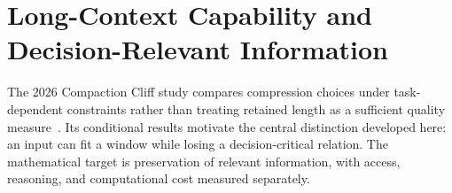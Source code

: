 \chapter{Long-Context Capability and Decision-Relevant Information}\label{ch:C11}

The 2026 Compaction Cliff study compares compression choices under task-dependent constraints rather than treating retained length as a sufficient quality measure~\cite{zerhoudi2026cliff}. Its conditional results motivate the central distinction developed here: an input can fit a window while losing a decision-critical relation. The mathematical target is preservation of relevant information, with access, reasoning, and computational cost measured separately.









